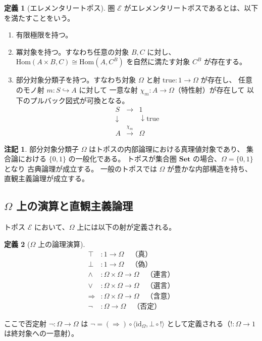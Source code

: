 \documentclass[11pt,a4paper]{article}
\theoremstyle{definition}
\newtheorem{definition}{定義}[section]
\newtheorem{remark}{注記}[section]
\newcommand{\topos}{\mathcal{E}}
\newcommand{\id}{\mathrm{id}}
\newcommand{\Hom}{\mathrm{Hom}}
\begin{document}
\begin{definition}[エレメンタリートポス]
圏 $\topos$ がエレメンタリートポスであるとは、以下を満たすことをいう。
\begin{enumerate}
\item 有限極限を持つ。
\item 冪対象を持つ。すなわち任意の対象 $B, C$ に対し、
  $\Hom(A \times B, C) \cong \Hom(A, C^B)$ を自然に満たす対象 $C^B$ が存在する。
\item 部分対象分類子を持つ。すなわち対象 $\Omega$ と射
  $\mathrm{true}: 1 \to \Omega$ が存在し、
  任意のモノ射 $m: S \hookrightarrow A$ に対して
  一意な射 $\chi_m: A \to \Omega$（特性射）が存在して
  以下のプルバック図式が可換となる。
  \[
  \begin{array}{ccc}
  S & \to & 1 \\
  \downarrow & & \downarrow \mathrm{true} \\
  A & \xrightarrow{\chi_m} & \Omega
  \end{array}
  \]
\end{enumerate}
\end{definition}

\begin{remark}
部分対象分類子 $\Omega$ はトポスの内部論理における真理値対象であり、
集合論における $\{0,1\}$ の一般化である。
トポスが集合圏 $\mathbf{Set}$ の場合、$\Omega = \{0,1\}$ となり
古典論理が成立する。
一般のトポスでは $\Omega$ が豊かな内部構造を持ち、
直観主義論理が成立する。
\end{remark}

\subsection{\texorpdfstring{$\Omega$}{Omega} 上の演算と直観主義論理}

トポス $\topos$ において、$\Omega$ 上には以下の射が定義される。

\begin{definition}[\texorpdfstring{$\Omega$}{Omega} 上の論理演算]
\begin{align}
\top &: 1 \to \Omega \quad \text{（真）} \\
\bot &: 1 \to \Omega \quad \text{（偽）} \\
\land &: \Omega \times \Omega \to \Omega \quad \text{（連言）} \\
\lor &: \Omega \times \Omega \to \Omega \quad \text{（選言）} \\
\Rightarrow &: \Omega \times \Omega \to \Omega \quad \text{（含意）} \\
\neg &: \Omega \to \Omega \quad \text{（否定）}
\end{align}

ここで否定射 $\neg: \Omega \to \Omega$ は
$\neg = (\Rightarrow) \circ \langle \id_\Omega, \bot \circ ! \rangle$
として定義される（$!: \Omega \to 1$ は終対象への一意射）。
\end{definition}
\end{document}
